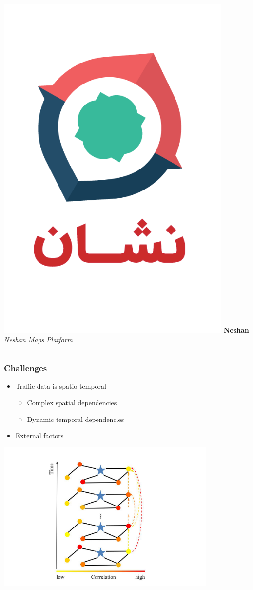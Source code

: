 \documentclass{beamer}
\begin{document}
\begin{frame}
\begin{columns}
		\includegraphics[height=0.5\textheight]{./img/neshan.png}
		\textbf{Neshan}\\
		\textit{Neshan Maps Platform}
	\end{columns}
\end{frame}
\begin{frame}
  \frametitle{Challenges}
  \begin{itemize}
      \item Traffic data is spatio-temporal
      \begin{itemize}
        \item Complex spatial dependencies
        \item Dynamic temporal dependencies
      \end{itemize}
      \item External factors
  \end{itemize}
  \includegraphics[height=0.5\textheight]{./img/correlations.png}
\end{frame}
\end{document}
